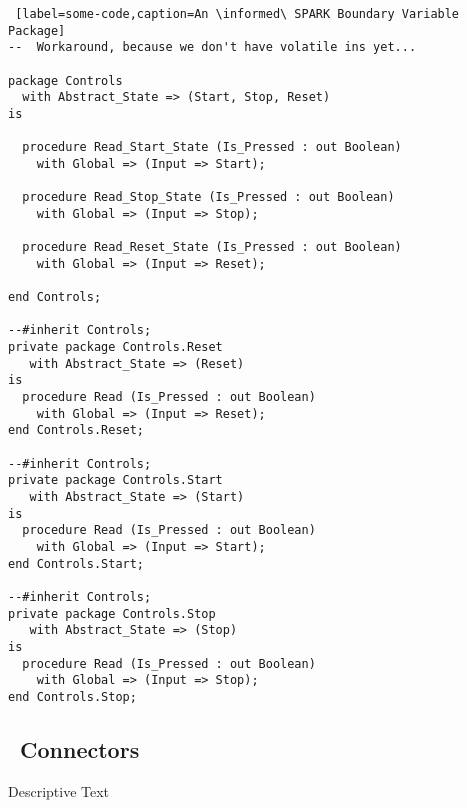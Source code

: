 \begin{lstlisting} [label=some-code,caption=An \informed\ SPARK Boundary Variable Package]
--  Workaround, because we don't have volatile ins yet...

package Controls
  with Abstract_State => (Start, Stop, Reset)
is

  procedure Read_Start_State (Is_Pressed : out Boolean)
    with Global => (Input => Start);

  procedure Read_Stop_State (Is_Pressed : out Boolean)
    with Global => (Input => Stop);

  procedure Read_Reset_State (Is_Pressed : out Boolean)
    with Global => (Input => Reset);

end Controls;

--#inherit Controls;
private package Controls.Reset
   with Abstract_State => (Reset)
is
  procedure Read (Is_Pressed : out Boolean)
    with Global => (Input => Reset);
end Controls.Reset;

--#inherit Controls;
private package Controls.Start
   with Abstract_State => (Start)
is
  procedure Read (Is_Pressed : out Boolean)
    with Global => (Input => Start);
end Controls.Start;

--#inherit Controls;
private package Controls.Stop
   with Abstract_State => (Stop)
is
  procedure Read (Is_Pressed : out Boolean)
    with Global => (Input => Stop);
end Controls.Stop;

\end{lstlisting}

\subsection{\informed\ Connectors}
\noindent\parbox[][][t]{.2\linewidth}{
  }%
\parbox[][][t]{.8\linewidth}{
Descriptive Text}
